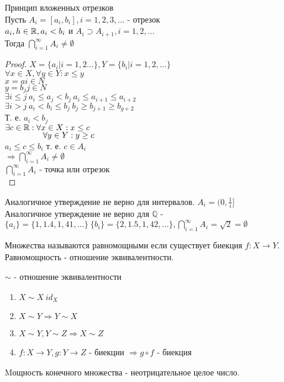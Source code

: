 
\begin{theorem} Принцип вложенных отрезков\\

Пусть $A_i = [a_i, b_i], i = 1,2,3,\dots$ - отрезок \\
$ a_i, h \in \mathbb{R}, a_i < b_i $ и $ A_i \supset A_{i+1} , i=1,2,\dots $ \\
Тогда $ \bigcap_{i=1}^{\infty} A_i \neq \emptyset $\\
\begin{proof} $ X = \{ a_i | i=1,2\dots \}, Y=\{b_i | i = 1,2,\dots\} $ \\
$ \forall x \in X, \forall y \in Y: x \leq y $ \\
$ x = a i \in N $\\
$ y = b_j j \in N$ \\
$ \exists i \leq j \ a_i \leq a_j < b_j \ a_i \leq a_{i+1} \leq a_{i+2} $ \\
$ \exists i > j \ a_i < b_i \leq b_j \ b_j \geq b_{j+1} \geq b_{g+2} $\\
Т. е. $ a_i < b_j $ \\
$ \exists c \in \mathbb{R} : \forall x \in X : x \leq c $ \\
$ \hspace*{16mm} \forall y \in Y : y \geq c $ \\
$ a_i \leq c \leq b_i $ т. е. $c \in A_i$ \\ 
$\Rightarrow \bigcap_{i=1}^{\infty} A_i \neq \emptyset$ \\
$ \bigcap_{i=1}^{\infty} A_i $ - точка или отрезок \\
\end{proof}
Аналогичное утверждение не верно для интервалов. $ A_i = (0, \frac{1}{i} ]$ \\
Аналогичное утверждение не верно для $\mathbb{Q}$ - $ \{a_i\} = \{1, 1.4, 1,41, \dots\}   \ \{b_i\} = \{2, 1.5, 1,42, \dots\},   \bigcap_{i=1}^{\infty} A_i = \sqrt{2} = \emptyset$
\end{theorem}


\begin{definition}
	Множества называются равномощными если существует биекция $ f: X \rightarrow Y $. Равномощность - отношение эквивалентности.\\
\end{definition}

\begin{definition} $ \sim $ - отношение эквивалентности \\
	\begin{enumerate}
		\item $X \sim X \ id_X$
		\item $ X \sim Y \Rightarrow Y \sim X$ 
		\item $ X \sim Y, Y \sim Z \Rightarrow X \sim Z $ 
		\item $ f: X \rightarrow Y, g: Y \rightarrow Z $ - биекции $\Rightarrow g \circ f $ - биекция 
	\end{enumerate}
\end{definition}
Mощность конечного множества - неотрицательное целое число. \\

